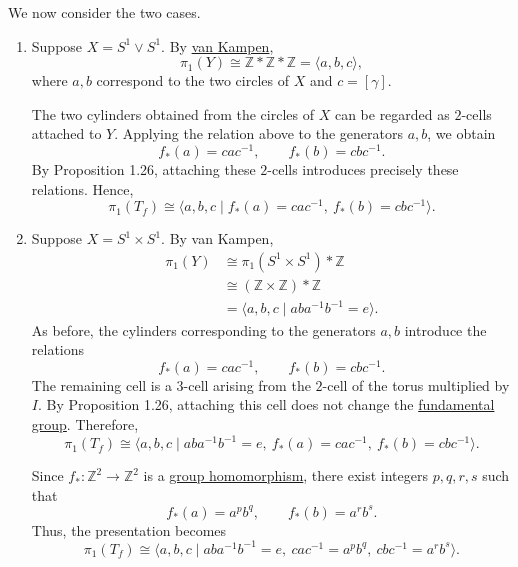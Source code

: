\begin{solution}
		We now consider the two cases.

		\begin{enumerate}
			\item Suppose $X = S^1 \vee S^1$. By \hyperref[thm:van-kampen-theorem]{van Kampen},
			\begin{equation}
				\pi_1(Y)
				\cong \mathbb{Z} \ast \mathbb{Z} \ast \mathbb{Z}
				= \langle a,b,c \rangle,
			\end{equation}
			where $a,b$ correspond to the two circles of $X$
			and $c=[\gamma]$.

			The two cylinders obtained from the circles of $X$
			can be regarded as $2$-cells attached to $Y$.
			Applying the relation above to the generators $a,b$,
			we obtain
			\begin{equation}
				f_\ast(a) = cac^{-1}, \qquad
				f_\ast(b) = cbc^{-1}.
			\end{equation}
			By Proposition 1.26, attaching these $2$-cells
			introduces precisely these relations. Hence,
			\begin{equation}
					\pi_1(T_f)
					\cong \langle a,b,c \mid
					f_\ast(a) = cac^{-1},\
					f_\ast(b) = cbc^{-1} \rangle.
			\end{equation}

			\item Suppose $X = S^1 \times S^1$. By van Kampen,
			\begin{align}
				\pi_1(Y)
				&\cong \pi_1(S^1 \times S^1) \ast \mathbb{Z}\\
				&\cong (\mathbb{Z} \times \mathbb{Z}) \ast \mathbb{Z}\\
				&= \langle a,b,c \mid aba^{-1}b^{-1}=e \rangle.
			\end{align}
			As before, the cylinders corresponding to the
			generators $a,b$ introduce the relations
			\begin{equation}
				f_\ast(a) = cac^{-1}, \qquad
				f_\ast(b) = cbc^{-1}.
			\end{equation}
			The remaining cell is a $3$-cell arising from the
			$2$-cell of the torus multiplied by $I$. By
			Proposition 1.26, attaching this cell does not
			change the \hyperref[def:fundamental-group]{fundamental group}. Therefore,
			\begin{equation}
					\pi_1(T_f)
					\cong \langle a,b,c \mid
					aba^{-1}b^{-1}=e,\
					f_\ast(a)=cac^{-1},\
					f_\ast(b)=cbc^{-1} \rangle.
			\end{equation}

			Since $f_\ast: \mathbb{Z}^2 \to \mathbb{Z}^2$ is a
			\hyperref[alg-def:group-homomorphism]{group homomorphism}, there exist integers $p,q,r,s$
			such that
			\begin{equation}
				f_\ast(a)=a^pb^q,\qquad
				f_\ast(b)=a^rb^s.
			\end{equation}
			Thus, the presentation becomes
			\begin{equation}
					\pi_1(T_f)
					\cong \langle a,b,c \mid
					aba^{-1}b^{-1}=e,\
					cac^{-1}=a^pb^q,\
					cbc^{-1}=a^rb^s \rangle.
			\end{equation}
		\end{enumerate}
	\end{solution}

